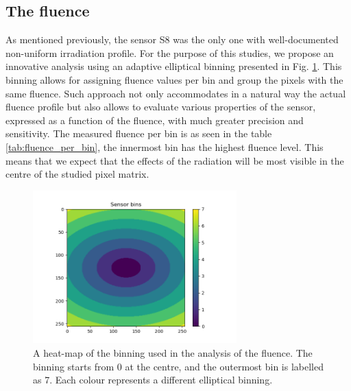 \subsection{The fluence}

As mentioned previously, the sensor S8 was the only one with well-documented non-uniform irradiation profile.
For the purpose of this studies, we propose an innovative analysis using an adaptive elliptical binning presented in Fig. \ref{fig:binning}.
This binning allows for assigning fluence values per bin and group the pixels with the same fluence. Such approach not only accommodates in a natural way the actual fluence profile but also allows to evaluate various properties of the sensor, expressed as a function of the fluence, with much greater precision and sensitivity.
The measured fluence per bin is as seen in the table \ref{tab:fluence_per_bin}, the innermost bin has the highest fluence level.
This means that we expect that the effects of the radiation will be most visible in the centre of the studied pixel matrix.

\begin{figure}[H]
\centering
\includegraphics[width=0.7\textwidth]{figures/chapter4/surrogates/p2_binning.png}
\caption{A heat-map of the binning used in the analysis of the fluence. The binning starts from 0 at the centre, and the outermost bin is labelled as 7. Each colour represents a different elliptical binning.} 
\label{fig:binning}
\end{figure}

